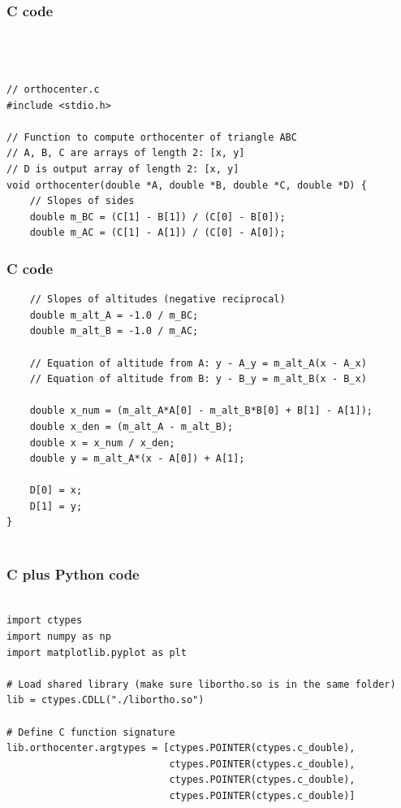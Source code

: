 \documentclass{beamer}
\begin{document}
\begin{frame}[fragile]
    \frametitle{C code}
    \begin{lstlisting}



// orthocenter.c
#include <stdio.h>

// Function to compute orthocenter of triangle ABC
// A, B, C are arrays of length 2: [x, y]
// D is output array of length 2: [x, y]
void orthocenter(double *A, double *B, double *C, double *D) {
    // Slopes of sides
    double m_BC = (C[1] - B[1]) / (C[0] - B[0]);
    double m_AC = (C[1] - A[1]) / (C[0] - A[0]);
\end{lstlisting}
 
\end{frame}
\begin{frame}[fragile]
    \frametitle{C code}
    \begin{lstlisting}
    // Slopes of altitudes (negative reciprocal)
    double m_alt_A = -1.0 / m_BC;
    double m_alt_B = -1.0 / m_AC;

    // Equation of altitude from A: y - A_y = m_alt_A(x - A_x)
    // Equation of altitude from B: y - B_y = m_alt_B(x - B_x)

    double x_num = (m_alt_A*A[0] - m_alt_B*B[0] + B[1] - A[1]);
    double x_den = (m_alt_A - m_alt_B);
    double x = x_num / x_den;
    double y = m_alt_A*(x - A[0]) + A[1];

    D[0] = x;
    D[1] = y;
}


\end{lstlisting}
 
\end{frame}
\begin{frame}[fragile]
    \frametitle{C plus Python code}
    \begin{lstlisting}

import ctypes
import numpy as np
import matplotlib.pyplot as plt

# Load shared library (make sure libortho.so is in the same folder)
lib = ctypes.CDLL("./libortho.so")

# Define C function signature
lib.orthocenter.argtypes = [ctypes.POINTER(ctypes.c_double),
                            ctypes.POINTER(ctypes.c_double),
                            ctypes.POINTER(ctypes.c_double),
                            ctypes.POINTER(ctypes.c_double)]
\end{lstlisting}
 
\end{frame}
\end{document}
